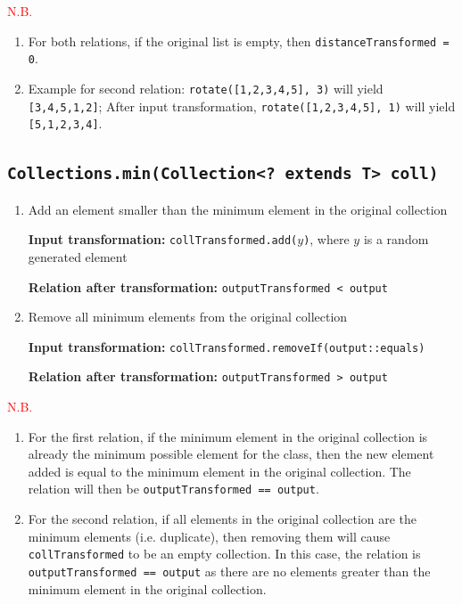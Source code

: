 \documentclass[12pt, a4paper]{article}
\begin{document}
\noindent\textcolor{red}{N.B.}
\begin{enumerate}
  \item For both relations, if the original list is empty, then \texttt{distanceTransformed = 0}.
  \item Example for second relation: \texttt{rotate([1,2,3,4,5], 3)} will yield
  \texttt{[3,4,5,1,2]}; After input transformation, \texttt{rotate([1,2,3,4,5], 1)} will yield
  \texttt{[5,1,2,3,4]}.
\end{enumerate}

\subsection{\texttt{Collections.min(Collection<? extends T> coll)}}
\begin{enumerate}
  \item Add an element smaller than the minimum element in the original collection
  \par\quad\textbf{Input transformation:} \texttt{collTransformed.add($y$)}, where $y$ is a random
  generated element
  \par\quad\textbf{Relation after transformation:} \texttt{outputTransformed < output}

  \item Remove all minimum elements from the original collection
  \par\quad\textbf{Input transformation:} \texttt{collTransformed.removeIf(output::equals)}
  \par\quad\textbf{Relation after transformation:} \texttt{outputTransformed > output}
\end{enumerate}

\noindent\textcolor{red}{N.B.}
\begin{enumerate}
  \item For the first relation, if the minimum element in the original collection is already the
  minimum possible element for the class, then the new element added is equal to the minimum element
  in the original collection. The relation will then be \texttt{outputTransformed == output}.
  \item For the second relation, if all elements in the original collection are the minimum elements
  (i.e. duplicate), then removing them will cause \texttt{collTransformed} to be an empty
  collection. In this case, the relation is \texttt{outputTransformed == output} as there are no
  elements greater than the minimum element in the original collection.
\end{enumerate}
\end{document}
